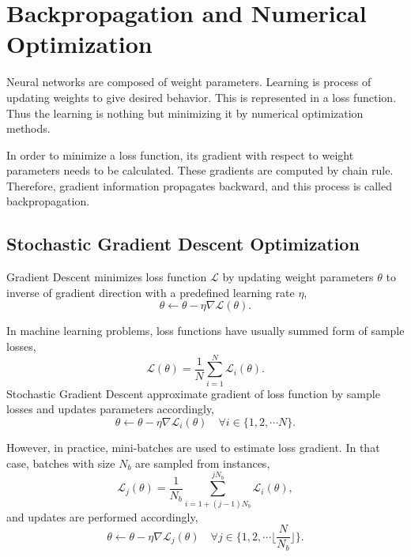 \section{Backpropagation and Numerical Optimization}
\label{sec:backprop}

Neural networks are composed of weight parameters. 
Learning is process of updating weights to give desired behavior. 
This is represented in a loss function. Thus the learning is nothing but minimizing it by numerical optimization methods. 

In order to minimize a loss function, its gradient with respect to weight parameters needs to be calculated. 
These gradients are computed by chain rule. 
Therefore, gradient information propagates backward, and this process is called backpropagation. 

\subsection{Stochastic Gradient Descent Optimization}

Gradient Descent minimizes loss function $\mathcal{L}$ by updating weight parameters $\theta$ to inverse of gradient direction with a predefined learning rate $\eta$, 
\begin{equation}
\label{eq: grad_desc}
\theta \leftarrow \theta - \eta \nabla \mathcal{L}(\theta).
\end{equation}

In machine learning problems, loss functions have usually summed form of sample losses, 
\begin{equation}
\label{eqn:summed_loss}
\mathcal{L}(\theta) = \frac{1}{N} \sum_{i=1}^{N} \mathcal{L}_i(\theta).
\end{equation}
Stochastic Gradient Descent approximate gradient of loss function by sample losses and updates parameters accordingly,
\begin{equation}
\label{eqn:stch_grad_desc}
\theta \leftarrow \theta - \eta \nabla \mathcal{L}_i(\theta) \quad \forall i \in \{1,2, \cdots N\}.
\end{equation}

However, in practice, mini-batches are used to estimate loss gradient. 
In that case, batches with size $N_b$ are sampled from instances, \begin{equation}
\label{eqn:mb_summed_loss}
\mathcal{L}_j(\theta) = \frac{1}{N_b} \sum_{i=1 + (j-1) N_b}^{j N_b} \mathcal{L}_i(\theta),
\end{equation}
and updates are performed accordingly,
\begin{equation}
\label{eqn:mb_grad_desc}
\theta \leftarrow \theta - \eta  \nabla \mathcal{L}_j(\theta) \quad \forall j \in \{1,2, \cdots \Big\lfloor\frac{N}{N_b}\Big\rfloor\}.
\end{equation}

